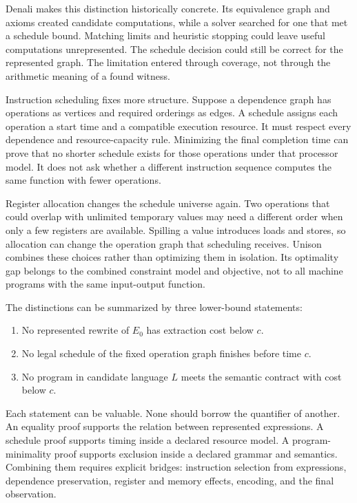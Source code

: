 Denali makes this distinction historically concrete. Its equivalence graph
and axioms created candidate computations, while a solver searched for one
that met a schedule bound. Matching limits and heuristic stopping could leave
useful computations unrepresented. The schedule decision could still be
correct for the represented graph. The limitation entered through coverage,
not through the arithmetic meaning of a found witness.

Instruction scheduling fixes more structure. Suppose a dependence graph has
operations as vertices and required orderings as edges. A schedule assigns
each operation a start time and a compatible execution resource. It must
respect every dependence and resource-capacity rule. Minimizing the final
completion time can prove that no shorter schedule exists for those operations
under that processor model. It does not ask whether a different instruction
sequence computes the same function with fewer operations.

Register allocation changes the schedule universe again. Two operations that
could overlap with unlimited temporary values may need a different order when
only a few registers are available. Spilling a value introduces loads and
stores, so allocation can change the operation graph that scheduling receives.
Unison combines these choices rather than optimizing them in isolation. Its
optimality gap belongs to the combined constraint model and objective, not to
all machine programs with the same input-output function.

The distinctions can be summarized by three lower-bound statements:

\begin{enumerate}
\item No represented rewrite of \(E_0\) has extraction cost below \(c\).
\item No legal schedule of the fixed operation graph finishes before time \(c\).
\item No program in candidate language \(L\) meets the semantic contract with
cost below \(c\).
\end{enumerate}

Each statement can be valuable. None should borrow the quantifier of another.
An equality proof supports the relation between represented expressions. A
schedule proof supports timing inside a declared resource model. A
program-minimality proof supports exclusion inside a declared grammar and
semantics. Combining them requires explicit bridges: instruction selection
from expressions, dependence preservation, register and memory effects,
encoding, and the final observation.

